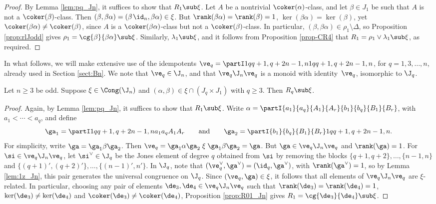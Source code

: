 \begin{proof} By Lemma \ref{lem:pq_Jn}, it suffices to show that $R_1\sub\xi$.  Let $A$ be a nontrivial $\coker(\alpha)$-class, and let $\beta\in J_1$ be such that $A$ is not a $\coker(\beta)$-class.  Then $(\beta,\beta\alpha)=(\beta\;\!\id_n,\beta\alpha)\in\xi$.  But $\rank(\beta\alpha)=\rank(\beta)=1$, $\ker(\beta\alpha)=\ker(\beta)$, yet $\coker(\beta\alpha)\not=\coker(\beta)$, since $A$ is a $\coker(\beta\alpha)$-class but not a $\coker(\beta)$-class.  In particular, $(\beta,\beta\alpha)\in\rho_1\setminus\Delta$, so Proposition \ref{prop:rlJodd} gives $\rho_1=\cg{\beta}{\beta\alpha}\sub\xi$.  Similarly, $\lambda_1\sub\xi$, and it follows from Proposition \ref{prop-CR4} that $R_1=\rho_1\vee\lambda_1\sub\xi$, as required. \end{proof}

In what follows,
we will make extensive use of the idempotents $\ve_q=\partI1q{q+1,q+2}{n-1,n}1q{q+1,q+2}{n-1,n}$, for $q=1,3,\ldots,n$, already used in Section \ref{sect:Bn}.  We note that $\ve_q\in\J_n$, and that $\ve_q\J_n\ve_q$ is a monoid with identity~$\ve_q$, isomorphic to $\J_q$.

%
\begin{lemma}\label{lem:qz_Jn}
Let $n\geq3$ be odd.  Suppose $\xi\in\Cong(\J_n)$ and $(\alpha,\beta)\in\xi\cap (J_q\times J_1)$ with $q\geq3$.  Then $R_q\sub\xi$.
\end{lemma}

\begin{proof} Again, by Lemma \ref{lem:pq_Jn}, it suffices to show that $R_1\sub\xi$.  Write $\alpha=\partI{a_1}{a_q}{A_1}{A_r}{b_1}{b_q}{B_1}{B_r}$, with $a_1<\cdots<a_q$, and define
\[
\ga_1=\partI1q{q+1,q+2}{n-1,n}{a_1}{a_q}{A_1}{A_r}
\qquad\text{and}\qquad
\ga_2=\partI{b_1}{b_q}{B_1}{B_r}1q{q+1,q+2}{n-1,n}.
\]
For simplicity, write $\ga=\ga_1\beta\ga_2$.
%
Then $\ve_q=\ga_1\alpha\ga_2\mathrel\xi\ga_1\beta\ga_2=\ga$.  But $\ga\in\ve_q\J_n\ve_q$ and ${\rank(\ga)=1}$.
%
For $\si\in\ve_q\J_n\ve_q$, let $\si^\vee\in\J_q$ be the Jones element of degree $q$ obtained from $\si$ by removing the blocks ${\{q+1,q+2\},\ldots,\{n-1,n\}}$ and $\{(q+1)',(q+2)'\},\ldots,\{(n-1)',n'\}$.
%
In $\J_q$, note that $(\ve_q^\vee,\ga^\vee)=(\id_q,\ga^\vee)$, with ${\rank(\ga^\vee)=1}$, so by Lemma \ref{lem:1z_Jn}, this pair generates the universal congruence on $\J_q$.  Since $(\ve_q,\ga)\in\xi$, it follows that all elements of $\ve_q\J_n\ve_q$ are $\xi$-related.  In particular, choosing any pair of elements $\de_3,\de_4\in\ve_q\J_n\ve_q$ such that $\rank(\de_3)=\rank(\de_4)=1$, $\ker(\de_3)\not=\ker(\de_4)$ and $\coker(\de_3)\not=\coker(\de_4)$, Proposition \ref{prop:R01_Jn} gives $R_1=\cg{\de_3}{\de_4}\sub\xi$.  \end{proof}




